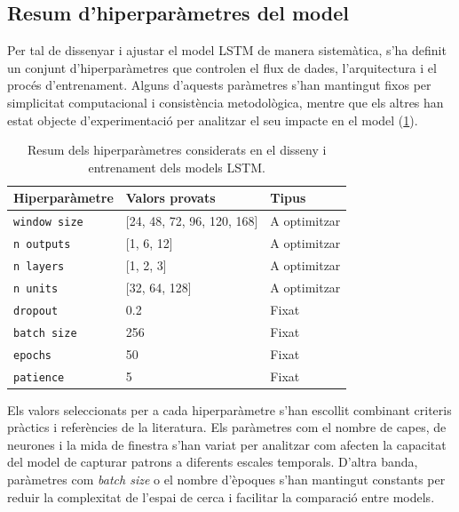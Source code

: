 \documentclass[../main.tex]{subfiles}
\begin{document}
\subsection{Resum d'hiperparàmetres del model}

Per tal de dissenyar i ajustar el model LSTM de manera sistemàtica, s’ha definit un conjunt d’hiperparàmetres que controlen el flux de dades, l’arquitectura i el procés d’entrenament. Alguns d’aquests paràmetres s’han mantingut fixos per simplicitat computacional i consistència metodològica, mentre que els altres han estat objecte d’experimentació per analitzar el seu impacte en el model (\cref{tab:resum_hiperparams}).

\begin{table}[H]
    \centering
    \renewcommand{\arraystretch}{1.3}
    \begin{tabular}{lll}
        \toprule
        \textbf{Hiperparàmetre} & \textbf{Valors provats} & \textbf{Tipus} \\
        \midrule
        \texttt{window size}            & [24, 48, 72, 96, 120, 168]& A optimitzar \\
        \texttt{n outputs}                 & [1, 6, 12]                    & A optimitzar \\
        \texttt{n layers}                   & [1, 2, 3]                      & A optimitzar \\
        \texttt{n units}                    & [32, 64, 128]               & A optimitzar \\
        \midrule
        \texttt{dropout}                    &  0.2                           & Fixat \\
        \texttt{batch size}             & 256                           & Fixat \\
        \texttt{epochs}                     & 50                              & Fixat \\
        \texttt{patience}               & 5                                 & Fixat \\
        \bottomrule
    \end{tabular}
    \caption{Resum dels hiperparàmetres considerats en el disseny i entrenament dels models LSTM.}
    \label{tab:resum_hiperparams}
\end{table}


Els valors seleccionats per a cada hiperparàmetre s’han escollit combinant criteris pràctics i referències de la literatura. Els paràmetres com el nombre de capes, de neurones i la mida de finestra s’han variat per analitzar com afecten la capacitat del model de capturar patrons a diferents escales temporals. D’altra banda, paràmetres com  \textit{batch size} o el nombre d’èpoques s’han mantingut constants per reduir la complexitat de l’espai de cerca i facilitar la comparació entre models.
\end{document}
